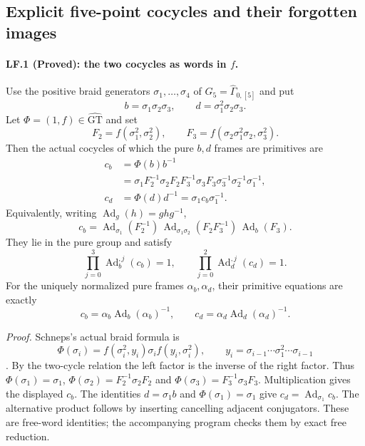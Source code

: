 \subsection{Explicit five-point cocycles and their forgotten images}

\paragraph{LF.1 (Proved): the two cocycles as words in $f$.}
Use the positive braid generators $\sigma_1,\ldots,\sigma_4$ of
$G_5=\widehat\Gamma_{0,[5]}$ and put
\[
 b=\sigma_1\sigma_2\sigma_3,\qquad
 d=\sigma_1^2\sigma_2\sigma_3.
\]
Let $\Phi=(1,f)\in\widehat{\mathrm{GT}}$ and set
\[
 F_2=f(\sigma_1^2,\sigma_2^2),\qquad
 F_3=f(\sigma_2\sigma_1^2\sigma_2,\sigma_3^2).
\]
Then the actual cocycles of which the pure $b,d$ frames are primitives
are
\begin{align*}
 c_b&=\Phi(b)b^{-1}\\
 &=\sigma_1F_2^{-1}\sigma_2F_2F_3^{-1}\sigma_3F_3
       \sigma_3^{-1}\sigma_2^{-1}\sigma_1^{-1},\\
 c_d&=\Phi(d)d^{-1}=\sigma_1c_b\sigma_1^{-1}.
\end{align*}
Equivalently, writing $\operatorname{Ad}_g(h)=ghg^{-1}$,
\[
 c_b=\operatorname{Ad}_{\sigma_1}(F_2^{-1})\,
      \operatorname{Ad}_{\sigma_1\sigma_2}(F_2F_3^{-1})\,
      \operatorname{Ad}_{b}(F_3).
\]
They lie in the pure group and satisfy
\[
 \prod_{j=0}^{3}\operatorname{Ad}_{b}^{,j}(c_b)=1,
 \qquad
 \prod_{j=0}^{2}\operatorname{Ad}_{d}^{,j}(c_d)=1.
\]
For the uniquely normalized pure frames $\alpha_b,\alpha_d$, their
primitive equations are exactly
\[
 c_b=\alpha_b\operatorname{Ad}_{b}(\alpha_b)^{-1},\qquad
 c_d=\alpha_d\operatorname{Ad}_{d}(\alpha_d)^{-1}.
\]

\emph{Proof.}
Schneps's actual braid formula is
\[
 \Phi(\sigma_i)=f(\sigma_i^2,y_i)\sigma_i
                         f(y_i,\sigma_i^2),\qquad
 y_i=\sigma_{i-1}\cdots\sigma_1^2\cdots\sigma_{i-1}
\]
\cite[Eq.~(1.3)]{LiftSchneps2006}. By the two-cycle relation the
left factor is the inverse of the right factor. Thus
$\Phi(\sigma_1)=\sigma_1$,
$\Phi(\sigma_2)=F_2^{-1}\sigma_2F_2$ and
$\Phi(\sigma_3)=F_3^{-1}\sigma_3F_3$. Multiplication gives the
displayed $c_b$. The identities $d=\sigma_1b$ and
$\Phi(\sigma_1)=\sigma_1$ give $c_d=\operatorname{Ad}_{\sigma_1}c_b$.
The alternative product follows by inserting cancelling adjacent
conjugators. These are free-word identities; the accompanying program
checks them by exact free reduction.

